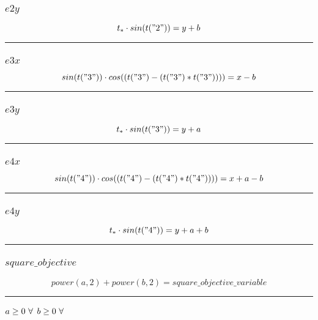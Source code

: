 \documentclass[11pt]{article}
\begin{document}
\subsubsection*{$e2y$}
\begin{equation*}
t_{*} \cdot  sin(t("2"))  = y + b
\end{equation*}
\vspace{5pt}
\hrule
\subsubsection*{$e3x$}
\begin{equation*}
 sin(t("3"))  \cdot  cos((t("3") - (t("3") * t("3"))))  = x - b
\end{equation*}
\vspace{5pt}
\hrule
\subsubsection*{$e3y$}
\begin{equation*}
t_{*} \cdot  sin(t("3"))  = y + a
\end{equation*}
\vspace{5pt}
\hrule
\subsubsection*{$e4x$}
\begin{equation*}
 sin(t("4"))  \cdot  cos((t("4") - (t("4") * t("4"))))  = x + a - b
\end{equation*}
\vspace{5pt}
\hrule
\subsubsection*{$e4y$}
\begin{equation*}
t_{*} \cdot  sin(t("4"))  = y + a + b
\end{equation*}
\vspace{5pt}
\hrule
\subsubsection*{$square\_objective$}
\begin{equation*}
 power(a,2)  +  power(b,2)  = square\_objective\_variable
\end{equation*}
\vspace{5pt}
\hrule
\bigskip
$a\geq 0 ~ \forall \\$
$b\geq 0 ~ \forall \\$
\end{document}
